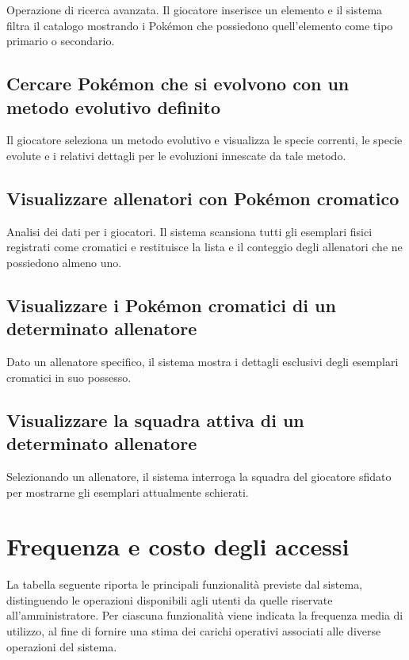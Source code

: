 \documentclass[a4paper,12pt]{report}
\begin{document}
Operazione di ricerca avanzata. Il giocatore inserisce un elemento e il sistema filtra il catalogo mostrando i Pokémon che possiedono quell'elemento come tipo primario o secondario.

\subsection{Cercare Pokémon che si evolvono con un metodo evolutivo definito}

Il giocatore seleziona un metodo evolutivo e visualizza le specie correnti, le specie evolute e i relativi dettagli per le evoluzioni innescate da tale metodo.

\subsection{Visualizzare allenatori con Pokémon cromatico}

Analisi dei dati per i giocatori. Il sistema scansiona tutti gli esemplari fisici registrati come cromatici e restituisce la lista e il conteggio degli allenatori che ne possiedono almeno uno.

\subsection{Visualizzare i Pokémon cromatici di un determinato allenatore}

Dato un allenatore specifico, il sistema mostra i dettagli esclusivi degli esemplari cromatici in suo possesso.

\subsection{Visualizzare la squadra attiva di un determinato allenatore}

Selezionando un allenatore, il sistema interroga la squadra del giocatore sfidato per mostrarne gli esemplari attualmente schierati.

\section{Frequenza e costo degli accessi}

La tabella seguente riporta le principali funzionalità previste dal sistema, distinguendo le operazioni
disponibili agli utenti da quelle riservate all'amministratore. Per ciascuna funzionalità viene indicata
la frequenza media di utilizzo, al fine di fornire una stima dei carichi operativi associati alle diverse
operazioni del sistema.
\end{document}
